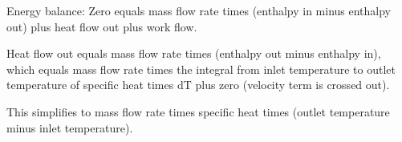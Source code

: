 Energy balance:  
Zero equals mass flow rate times (enthalpy in minus enthalpy out) plus heat flow out plus work flow.  

Heat flow out equals mass flow rate times (enthalpy out minus enthalpy in), which equals mass flow rate times the integral from inlet temperature to outlet temperature of specific heat times dT plus zero (velocity term is crossed out).  

This simplifies to mass flow rate times specific heat times (outlet temperature minus inlet temperature).
